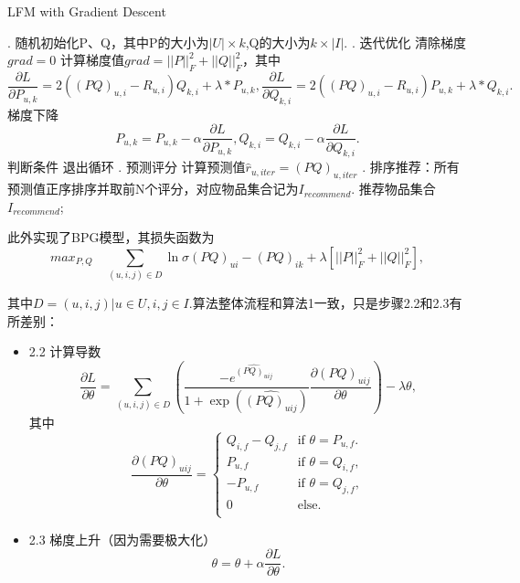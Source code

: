 \documentclass[12pt, a4paper]{ctexart}
\begin{document}
\begin{algorithm}[ht] 
\caption{LFM with Gradient Descent}
\label{alg:Framwork} 
\begin{algorithmic} 
. 随机初始化P、Q，其中P的大小为$|U|×k$,Q的大小为$k×|I|$.
. 迭代优化
     清除梯度$grad = 0$
     计算梯度值$grad = ||P||^2_F+||Q||^2_F$，其中
    $$\frac{\partial L}{\partial P_{u,k}}=2((PQ)_{u,i}-R_{u,i})Q_{k,i}+\lambda*{P_{u,k}},\frac{\partial L}{\partial Q_{k,i}}=2((PQ)_{u,i}-R_{u,i})P_{u,k}+\lambda*{Q_{k,i}}.$$
     梯度下降
    $$P_{u,k} = P_{u,k} - \alpha{\frac{\partial L}{\partial P_{u,k}}},Q_{k,i} = Q_{k,i} - \alpha{\frac{\partial L}{\partial Q_{k,i}}}.$$
     判断条件 {
        \STATE 退出循环
    \ENDIF}
\ENDFOR
{}. 预测评分{ 
     计算预测值$\hat{r}_{u,iter} = (PQ)_{u,iter}$
\ENDFOR}
. 排序推荐：所有预测值正序排序并取前N个评分，对应物品集合记为$I_{recommend}$.
\RETURN 推荐物品集合$I_{recommend}$; %
\end{algorithmic}
\end{algorithm}


此外实现了BPG模型，其损失函数为
$$max_{P,Q}\quad \sum_{(u,i,j)\in D}{\ln{\sigma{(PQ)_{ui}-(PQ)_{ik}}}}+\lambda[||P||_F^2+||Q||_F^2],$$

其中$D = {(u,i,j)|u\in U, i,j\in I}$.算法整体流程和算法1一致，只是步骤2.2和2.3有所差别：

\begin{itemize}
    \item 2.2 计算导数
    $$\frac{\partial L}{\partial \theta} = \sum_{(u,i,j)\in D} \left( \frac{-e^{\hat{(PQ)_{uij}}}}{1+\exp\left(\hat{(PQ)_{uij}}\right)} \frac{\partial{(PQ)_{uij}}}{\partial\theta} \right) - \lambda\theta,$$
    其中
    \[ \frac{\partial{(PQ)_{uij}}}{\partial\theta} =
    \begin{cases}
    Q_{i,f}-Q_{j,f} & \text{if } \theta =P_{u,f}. \\
    P_{u,f} & \text{if } \theta =Q_{i,f}, \\
    -P_{u,f} & \text{if } \theta =Q_{j,f}, \\
    0 & \text{else.}\\
    \end{cases} \]
    \item 2.3 梯度上升（因为需要极大化）
    $$\theta = \theta + \alpha \frac{\partial L}{\partial \theta} .$$
\end{itemize}
\end{document}
